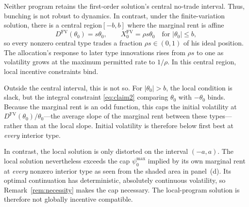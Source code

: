 \documentclass[12pt]{article}
\begin{document}

Neither program retains the first-order solution's central no-trade interval. Thus, bunching is not robust to dynamics. In contrast, under the finite-variation solution, there is a central region$[-b,b]$ where the marginal rent is affine
\[
  D^{\mathrm{FV}}(\theta_0)=s\theta_0,
  \qquad
  X_0^{\mathrm{FV}}=\rho s\theta_0
  \quad\text{for }|\theta_0|\leq b,
\]
so every nonzero central type trades a fraction \(\rho s\in(0,1)\)
of his ideal position. The allocation's response to later type
innovations rises from \(\rho s\) to one as volatility grows at the
maximum permitted rate to \(1/\rho\). In this central region, local incentive constraints bind. 

Outside the central interval, this is not so. For
\(|\theta_0|>b\), the local condition is slack, but the integral constraint \eqref{eq:claim2}
comparing \(\theta_0\) with \(-\theta_0\) binds. Because
the marginal rent is an odd function, this caps the initial volatility at
\(D^{\mathrm{FV}}(\theta_0)/\theta_0\)---the average slope of the marginal rent
between these types---rather than at the local slope. Initial
volatility is therefore below first best at \emph{every} interior type.

In contrast, the local solution is only distorted on  the interval \((-a,a)\). The local solution nevertheless exceeds the cap \(\psi_0^{\max}\)
implied by its own marginal rent at \emph{every} nonzero interior type as seen from the shaded area in panel~(d). Its optimal
continuation has deterministic, absolutely continuous volatility, so
Remark~\ref{rem:necessity} makes the cap necessary. The local-program
solution is therefore not globally incentive compatible.

\end{document}
